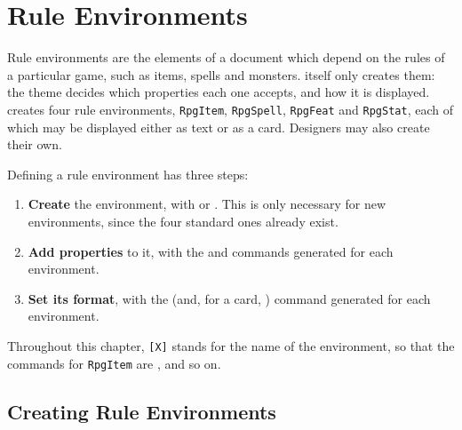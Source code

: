 \chapter{Rule Environments}\label{C:ThemeRuleEnvs}

	Rule environments  are the elements of a document which depend on the rules of a particular game, such as items, spells and monsters. \rpgtex{} itself only creates them: the theme decides which properties each one accepts, and how it is displayed. \rpgtex{} creates four rule environments, \texttt{RpgItem}, \texttt{RpgSpell}, \texttt{RpgFeat} and \texttt{RpgStat}, each of which may be displayed either as text or as a card. Designers may also create their own.

	Defining a rule environment has three steps:
	\begin{enumerate}
		\item \textbf{Create} the environment, with  or . This is only necessary for new environments, since the four standard ones already exist.
		\item \textbf{Add properties} to it, with the  and  commands generated for each environment.
		\item \textbf{Set its format}, with the  (and, for a card, ) command generated for each environment.
	\end{enumerate}
	Throughout this chapter, \texttt{[X]} stands for the name of the environment, so that the commands for \texttt{RpgItem} are ,  and so on.


	\section{Creating Rule Environments}\label{S:ThemeNewRuleEnv}

